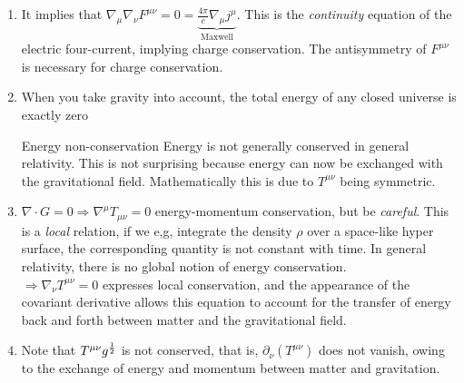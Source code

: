 \begin{enumerate}
\item 	It implies that $\nabla_{\mu} \nabla_{\nu} F^{\mu \nu} = 0 = \underbrace{\frac{4 \pi}{c} \nabla_{\mu} j^{\mu}}_{\mathrm{Maxwell}}$. This is the \emph{continuity} equation of the electric four-current, implying charge conservation. The antisymmetry of $F^{\mu \nu}$ is necessary for charge conservation.
	\item When you take gravity into account, the total energy of any closed universe is exactly zero
	\begin{mybox}{Energy non-conservation}
		Energy is not generally conserved in general relativity. This is not surprising because energy can now be exchanged with the gravitational field. Mathematically this is due to $T^{\mu \nu}$ being symmetric.
	\end{mybox}
\item $\nabla \cdot G = 0 \Rightarrow \nabla^{\mu} T_{\mu \nu} =0$ energy-momentum conservation, but be \emph{careful}. This is a \emph{local} relation, if we e,g, integrate the density $\rho$ over a space-like hyper surface, the corresponding quantity is not constant with time. In general relativity, there is no global notion of energy conservation.\\
$\Rightarrow \nabla_{\nu} T^{\mu \nu}=0$ expresses local conservation, and the appearance of the covariant derivative allows this equation to account for the transfer of energy back and forth between matter and the gravitational field.
\item Note that $T^{\mu \nu} g^{\frac{1}{2}}$ is not conserved, that is, $\partial_\nu (T^{\mu \nu})$ does not vanish, owing to the exchange of energy and momentum between matter and gravitation.
\end{enumerate}

